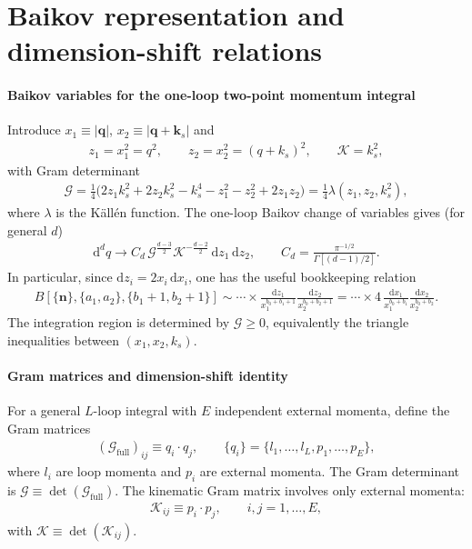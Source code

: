 \documentclass[a4paper,12pt]{article}
\def\di{{\mathrm{d}}}
\newcommand{\mG}{\mathcal{G}}
\newcommand{\mK}{\mathcal{K}}
\def\to{\rightarrow}
\begin{document}
\section{Baikov representation and dimension-shift relations}
\label{sec:baikov}
\paragraph{Baikov variables for the one-loop two-point momentum integral}
Introduce $x_1\equiv|\bm q|$, $x_2\equiv|\bm q+\bm k_s|$ and
\begin{align}
	z_1=x_1^2=q^2,\qquad z_2=x_2^2=(q+k_s)^2,\qquad \mK=k_s^2,
\end{align}
with Gram determinant
\begin{align}
	\mG=\frac{1}{4}\Big(2 z_1 k_s^2+2 z_2 k_s^2-k_s^4-z_1^2-z_2^2+2 z_1 z_2\Big)
	=\frac{1}{4}\lambda(z_1,z_2,k_s^2),
\end{align}
where $\lambda$ is the K\"all\'en function. The one-loop Baikov change of variables gives (for general $d$)
\begin{align}
	\di^d q \to C_d\,\mG^{\frac{d-3}{2}}\mK^{-\frac{d-2}{2}}\,\di z_1\,\di z_2,
	\qquad C_{d} = \frac{\pi^{-1/2}}{\Gamma[(d-1)/2]}.
\end{align}
In particular, since $\di z_i=2x_i\,\di x_i$, one has the useful bookkeeping relation
\begin{align}
	B[\{\bm{n}\},\{a_1,a_2\},\{b_1+1,b_2+1\}]
	\sim \cdots \times \frac{\di z_1}{x_1^{b_0+b_1+1}}\frac{\di z_2}{x_2^{b_0+b_2+1}}
	= \cdots \times 4\,\frac{\di x_1}{x_1^{b_0+b_1}}\frac{\di x_2}{x_2^{b_0+b_2}}.
\end{align}
The integration region is determined by $\mG\ge 0$, equivalently the triangle inequalities between $(x_1,x_2,k_s)$.

\paragraph{Gram matrices and dimension-shift identity}
For a general $L$-loop integral with $E$ independent external momenta, define the Gram matrices
\begin{align}
	(\mG_{\text{full}})_{ij} \equiv q_i \cdotp q_j, \qquad \{q_i\} = \{l_1,\dots,l_L,p_1,\dots,p_E\},
\end{align}
where $l_i$ are loop momenta and $p_i$ are external momenta. The Gram determinant is $\mG \equiv \det(\mG_{\text{full}})$. The kinematic Gram matrix involves only external momenta:
\begin{align}
	\mK_{ij} \equiv p_i \cdotp p_j, \qquad i,j = 1,\dots,E,
\end{align}
with $\mK \equiv \det(\mK_{ij})$.
\end{document}
